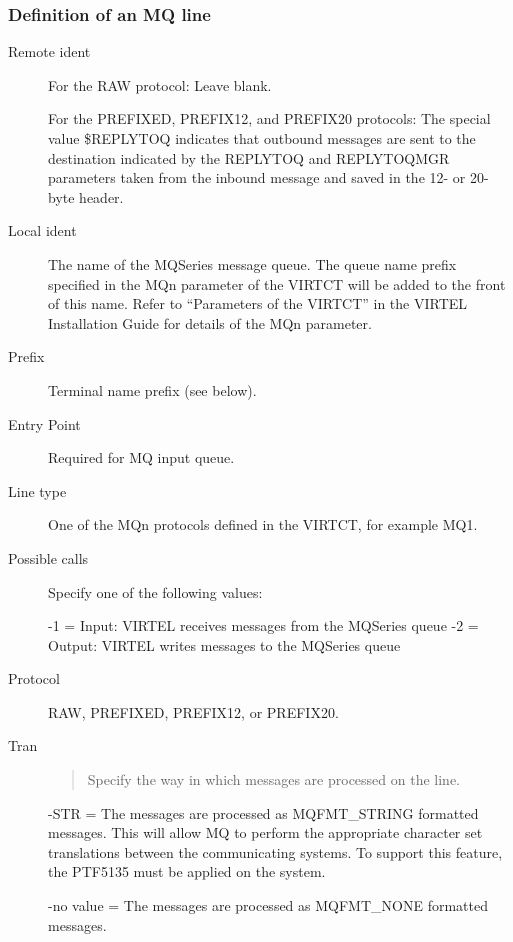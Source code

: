 \documentclass[letterpaper,10pt,english]{sphinxmanual}
\begin{document}


\subsubsection{Definition of an MQ line}
\label{\detokenize{connectivity_guide:definition-of-an-mq-line}}\begin{description}
\item[{Remote ident}] \leavevmode
For the RAW protocol: Leave blank.

For the PREFIXED, PREFIX12, and PREFIX20 protocols: The special
value \$REPLYTOQ indicates that outbound messages are sent to the
destination indicated by the REPLYTOQ and REPLYTOQMGR parameters
taken from the inbound message and saved in the 12- or 20-byte
header.

\item[{Local ident}] \leavevmode
The name of the MQSeries message queue. The queue name prefix
specified in the MQn parameter of the VIRTCT will be added to the
front of this name. Refer to “Parameters of the VIRTCT” in the
VIRTEL Installation Guide for details of the MQn parameter.

\item[{Prefix}] \leavevmode
Terminal name prefix (see below).

\item[{Entry Point}] \leavevmode
Required for MQ input queue.

\item[{Line type}] \leavevmode
One of the MQn protocols defined in the VIRTCT, for example MQ1.

\item[{Possible calls}] \leavevmode
Specify one of the following values:

-1 = Input: VIRTEL receives messages from the MQSeries queue
-2 = Output: VIRTEL writes messages to the MQSeries queue

\item[{Protocol}] \leavevmode
RAW, PREFIXED, PREFIX12, or PREFIX20.

\item[{Tran}] \leavevmode\begin{quote}

Specify the way in which messages are processed on the line.
\end{quote}

-STR = The messages are processed as MQFMT\_STRING formatted messages. This will allow MQ to perform the appropriate character set translations between the communicating systems. To support this feature, the PTF5135 must be applied on the system.

-no value = The messages are processed as MQFMT\_NONE formatted messages.

\end{description}
\end{document}
